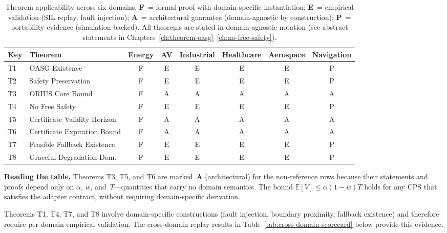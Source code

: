 \begin{table}[htbp]
\centering
\caption{Theorem applicability across six domains.
  \textbf{F}~= formal proof with domain-specific instantiation;
  \textbf{E}~= empirical validation (SIL replay, fault injection);
  \textbf{A}~= architectural guarantee (domain-agnostic by construction);
  \textbf{P}~= portability evidence (simulation-backed).
  All theorems are stated in domain-agnostic notation (see abstract
  statements in Chapters~\ref{ch:theorem-oasg}--\ref{ch:no-free-safety}).}
\label{tab:theorem-applicability}
\begin{tabular}{llcccccc}
\toprule
\textbf{Key} & \textbf{Theorem} & \textbf{Energy} & \textbf{AV} &
  \textbf{Industrial} & \textbf{Healthcare} & \textbf{Aerospace} &
  \textbf{Navigation} \\
\midrule
T1 & OASG Existence              & F & E & E & E & E & P \\
T2 & Safety Preservation         & F & E & E & E & E & P \\
T3 & ORIUS Core Bound            & F & A & A & A & A & A \\
T4 & No Free Safety              & F & E & E & E & E & P \\
T5 & Certificate Validity Horizon & F & A & A & A & A & A \\
T6 & Certificate Expiration Bound & F & A & A & A & A & A \\
T7 & Feasible Fallback Existence & F & E & E & E & E & P \\
T8 & Graceful Degradation Dom.\  & F & E & E & E & E & P \\
\bottomrule
\end{tabular}
\end{table}

\noindent\textbf{Reading the table.}
Theorems T3, T5, and T6 are marked~\textbf{A} (architectural) for the
non-reference rows because their statements and proofs depend only on
$\alpha$, $\bar{w}$, and~$T$---quantities that carry no domain semantics.
The bound $\mathbb{E}[V] \le \alpha(1-\bar{w})T$ holds for any CPS
that satisfies the adapter contract, without requiring domain-specific
derivation.

Theorems T1, T4, T7, and T8 involve domain-specific constructions
(fault injection, boundary proximity, fallback existence) and therefore
require per-domain empirical validation.  The cross-domain replay results
in Table~\ref{tab:cross-domain-scorecard} below provide this evidence.

